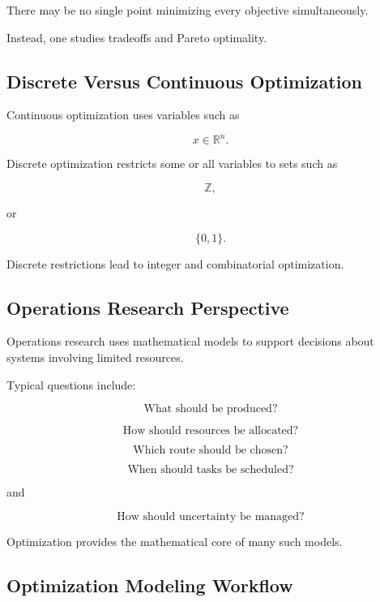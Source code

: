 There may be no single point minimizing every objective simultaneously.

Instead, one studies tradeoffs and Pareto optimality.

\subsection{Discrete Versus Continuous Optimization}
\label{subsec:discrete-continuous-optimization}

Continuous optimization uses variables such as

\[
\boxed{
x\in\mathbb{R}^n.
}
\]

Discrete optimization restricts some or all variables to sets such as

\[
\boxed{
\mathbb{Z},
}
\]

or

\[
\boxed{
\{0,1\}.
}
\]

Discrete restrictions lead to integer and combinatorial optimization.

\subsection{Operations Research Perspective}
\label{subsec:operations-research-perspective}

Operations research uses mathematical models to support decisions about
systems involving limited resources.

Typical questions include:

\[
\boxed{
\text{What should be produced?}
}
\]

\[
\boxed{
\text{How should resources be allocated?}
}
\]

\[
\boxed{
\text{Which route should be chosen?}
}
\]

\[
\boxed{
\text{When should tasks be scheduled?}
}
\]

and

\[
\boxed{
\text{How should uncertainty be managed?}
}
\]

Optimization provides the mathematical core of many such models.

\subsection{Optimization Modeling Workflow}
\label{subsec:optimization-modeling-workflow}

